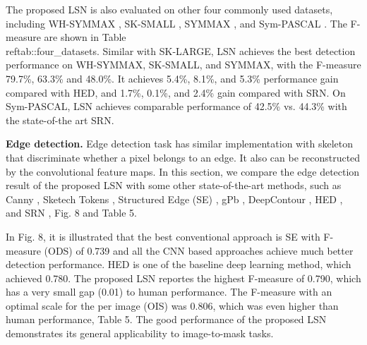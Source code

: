 \documentclass[runningheads]{llncs}
\begin{document}


The proposed LSN is also evaluated on other four commonly used datasets, including WH-SYMMAX \cite{ref17}, SK-SMALL \cite{ref7}, SYMMAX \cite{ref15}, and Sym-PASCAL \cite{ref1}. The F-measure are shown in Table\\ref{tab::four_datasets}. Similar with SK-LARGE, LSN achieves the best detection performance on WH-SYMMAX, SK-SMALL, and SYMMAX, with the F-measure 79.7\%, 63.3\% and 48.0\%. It achieves 5.4\%, 8.1\%, and 5.3\% performance gain compared with HED, and 1.7\%, 0.1\%, and 2.4\% gain compared with SRN. On Sym-PASCAL, LSN achieves comparable performance of 42.5\% vs. 44.3\% with the state-of-the art SRN.


\textbf{Edge detection.} 
Edge detection task has similar implementation with skeleton that discriminate whether a pixel belongs to an edge. It also can be reconstructed by the convolutional feature maps. In this section, we compare the edge detection result of the proposed LSN with some other state-of-the-art methods, such as Canny \cite{ref40}, Sketech Tokens \cite{ref39}, Structured Edge (SE) \cite{ref38}, gPb \cite{ref35}, DeepContour \cite{ref18}, HED \cite{ref6}, and SRN \cite{ref1}, Fig. 8 and Table 5.

In Fig. 8, it is illustrated that the best conventional approach is SE with F-measure (ODS) of 0.739 and all the CNN based approaches achieve much better detection performance. HED is one of the baseline deep learning method, which achieved 0.780. The proposed LSN reportes the highest F-measure of 0.790, which has a very small gap (0.01) to human performance. The F-measure with an optimal scale for the per image (OIS) was 0.806, which was even higher than human performance, Table 5. The good performance of the proposed LSN demonstrates its general applicability to image-to-mask tasks.
\end{document}
